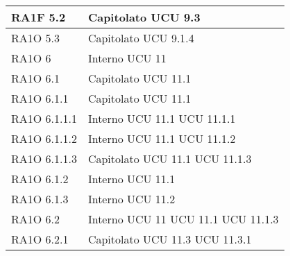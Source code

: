 \begin{center}
\begin{longtable}{ | p{5cm} | p{5cm} |}
        RA1F 5.2 &  Capitolato \newline  UCU 9.3 \newline  \\ \hline      
        RA1O 5.3 &  Capitolato \newline  UCU 9.1.4 \newline  \\ \hline      
        RA1O 6 &  Interno \newline  UCU 11 \newline  \\ \hline      
        RA1O 6.1 &  Capitolato \newline  UCU 11.1 \newline  \\ \hline      
        RA1O 6.1.1 &  Capitolato \newline  UCU 11.1 \newline  \\ \hline      
        RA1O 6.1.1.1 &  Interno \newline  UCU 11.1 \newline  UCU 11.1.1 \newline  \\ \hline      
        RA1O 6.1.1.2 &  Interno \newline  UCU 11.1 \newline  UCU 11.1.2 \newline  \\ \hline      
        RA1O 6.1.1.3 &  Capitolato \newline  UCU 11.1 \newline  UCU 11.1.3 \newline  \\ \hline      
        RA1O 6.1.2 &  Interno \newline  UCU 11.1 \newline  \\ \hline      
        RA1O 6.1.3 &  Interno \newline  UCU 11.2 \newline  \\ \hline      
        RA1O 6.2 &  Interno \newline  UCU 11 \newline  UCU 11.1 \newline  UCU 11.1.3 \newline  \\ \hline      
        RA1O 6.2.1 &  Capitolato \newline  UCU 11.3 \newline  UCU 11.3.1 \newline  \\ \hline      

\end{longtable}
\end{center}
